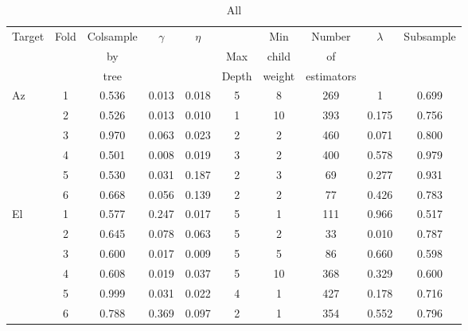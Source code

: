
\begin{table}[!htbp]
    \centering
    \caption{All}
    \begin{tabular}{lccccccccc}
        \toprule
        \multirow{3}{*}{Target} & \multirow{3}{*}{Fold} &  Colsample &  \multirow{3}{*}{$\gamma$} &  \multirow{3}{*}{$\eta$} &   &  Min &  Number &  \multirow{3}{*}{$\lambda$} &  \multirow{3}{*}{Subsample} \\
        & & by   & & & Max   & child  & of         & & \\
        & & tree & & & Depth & weight & estimators & & \\
        \midrule
        \multirow{6}{*}{Az} &   1 &   0.536 &  0.013 &          0.018 &      5 &             8 &       269 &       1 &      0.699 \\
                            &   2 &   0.526 &  0.013 &          0.010 &      1 &            10 &       393 &       0.175 &      0.756 \\
                            &   3 &   0.970 &  0.063 &          0.023 &      2 &             2 &       460 &       0.071 &      0.800 \\
                            &   4 &   0.501 &  0.008 &          0.019 &      3 &             2 &       400 &       0.578 &      0.979 \\
                            &   5 &   0.530 &  0.031 &          0.187 &      2 &             3 &        69 &       0.277 &      0.931 \\
                            &   6 &   0.668 &  0.056 &          0.139 &      2 &             2 &        77 &       0.426 &      0.783 \\
        \hline
        \multirow{6}{*}{El} &   1 &   0.577 &  0.247 &          0.017 &      5 &             1 &       111 &       0.966 &      0.517 \\
                            &   2 &   0.645 &  0.078 &          0.063 &      5 &             2 &        33 &       0.010 &      0.787 \\
                            &   3 &   0.600 &  0.017 &          0.009 &      5 &             5 &        86 &       0.660 &      0.598 \\
                            &   4 &   0.608 &  0.019 &          0.037 &      5 &            10 &       368 &       0.329 &      0.600 \\
                            &   5 &   0.999 &  0.031 &          0.022 &      4 &             1 &       427 &       0.178 &      0.716 \\
                            &   6 &   0.788 &  0.369 &          0.097 &      2 &             1 &       354 &       0.552 &      0.796 \\
        \bottomrule
        \end{tabular}
\end{table}

